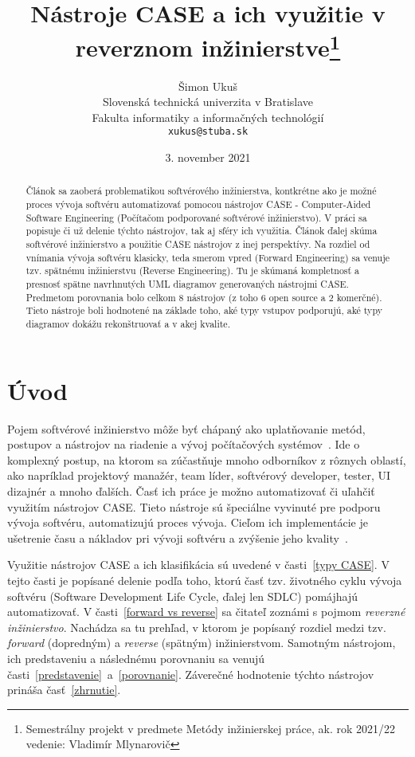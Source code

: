 \documentclass[10pt,twoside,slovak,a4paper]{article}
\title{Nástroje CASE a ich využitie v reverznom inžinierstve\thanks{Semestrálny projekt v predmete Metódy inžinierskej práce, ak. rok 2021/22 vedenie: Vladimír Mlynarovič}} %
\author{Šimon Ukuš\\[2pt]
	{\small Slovenská technická univerzita v Bratislave}\\
	{\small Fakulta informatiky a informačných technológií}\\
	{\small \texttt{xukus@stuba.sk}}
	}
\date{\small 3. november 2021}
\begin{document}
\maketitle

\begin{abstract}
Článok sa zaoberá problematikou softvérového inžinierstva, kontkrétne ako je možné proces vývoja softvéru automatizovať pomocou nástrojov CASE - Computer-Aided Software Engineering (Počítačom podporované softvérové inžinierstvo). V práci sa popisuje či už delenie týchto nástrojov,  tak aj sféry ich využitia.  Článok ďalej skúma softvérové inžinierstvo a použitie CASE nástrojov z inej perspektívy.  Na rozdiel od vnímania vývoja softvéru klasicky, teda smerom vpred (Forward Engineering) sa venuje tzv. spätnému inžinierstvu (Reverse Engineering). Tu je skúmaná kompletnosť a presnosť spätne navrhnutých UML diagramov generovaných nástrojmi CASE. Predmetom porovnania bolo celkom 8 nástrojov (z toho 6 open source a 2 komerčné). Tieto nástroje boli hodnotené na základe toho, aké typy vstupov podporujú, aké typy diagramov dokážu rekonštruovať a v akej kvalite.
 
\end{abstract}



\section{Úvod}
Pojem softvérové inžinierstvo môže byť chápaný ako uplatňovanie metód, postupov a nástrojov na riadenie a vývoj počítačových systémov~\cite{1985}. Ide o komplexný postup, na ktorom sa zúčastňuje mnoho odborníkov z rôznych oblastí, ako napríklad projektový manažér, team líder, softvérový developer, tester, UI dizajnér a mnoho ďalších. Časť ich práce je možno automatizovať či uľahčiť využitím nástrojov CASE. Tieto nástroje sú špeciálne vyvinuté pre podporu vývoja softvéru, automatizujú proces vývoja. Cieľom ich implementácie je ušetrenie času a nákladov pri vývoji softvéru a zvýšenie jeho kvality~\cite{Osama:Adoption}.

Využitie nástrojov CASE a ich klasifikácia sú uvedené v časti~\ref{typy CASE}. V tejto časti je popísané delenie podľa toho, ktorú časť tzv. životného cyklu vývoja softvéru (Software Development Life Cycle, ďalej len SDLC) pomájhajú automatizovať. 
V časti~\ref{forward vs reverse} sa čitateľ zoznámi s pojmom \emph{reverzné inžinierstvo}. Nachádza sa tu prehľad, v ktorom je popísaný rozdiel medzi tzv. \emph{forward} (dopredným) a \emph{reverse} (spätným) inžinierstvom. 
Samotným nástrojom, ich predstaveniu a následnému porovnaniu sa venujú časti~\ref{predstavenie}~a~\ref{porovnanie}.
Záverečné hodnotenie týchto nástrojov prináša časť~\ref{zhrnutie}.
\end{document}
